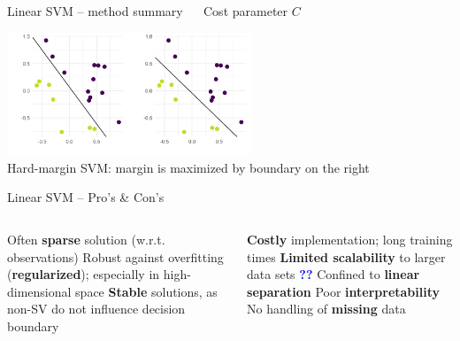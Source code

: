 \begin{vbframe}{Linear SVM -- method summary}
 ~~ Cost parameter \textbf{$C$}

\hfill

\includegraphics[width=0.55\textwidth]{
  ../slides/linear-svm/figure/linear_classif_1.png}  \\
  \tiny{Hard-margin SVM: margin is maximized by boundary on the right}
  \normalsize

\end{vbframe}


\setdraft

\begin{frame}{Linear SVM -- Pro's \& Con's}

\begin{columns}[onlytextwidth]
  \begin{column}{0.5\textwidth}
    \footnotesize
    \begin{itemize}
      \positem Often \textbf{sparse} solution (w.r.t. observations)
      \positem Robust against overfitting (\textbf{regularized}); especially in 
      high-dimensional space
      \positem \textbf{Stable} solutions, as non-SV do not influence decision 
      boundary
    \end{itemize}
  \end{column}

  \begin{column}{0.5\textwidth}
    \footnotesize
    \begin{itemize}
      \negitem \textbf{Costly} implementation; long training times
      \negitem \textbf{Limited scalability} to larger data sets 
      \textcolor{blue}{\textbf{??}}
      \negitem Confined to \textbf{linear separation}
      \negitem Poor \textbf{interpretability}
      \negitem No handling of \textbf{missing} data
    \end{itemize}
  \end{column}
\end{columns}

\vfill

\small


\end{frame}


